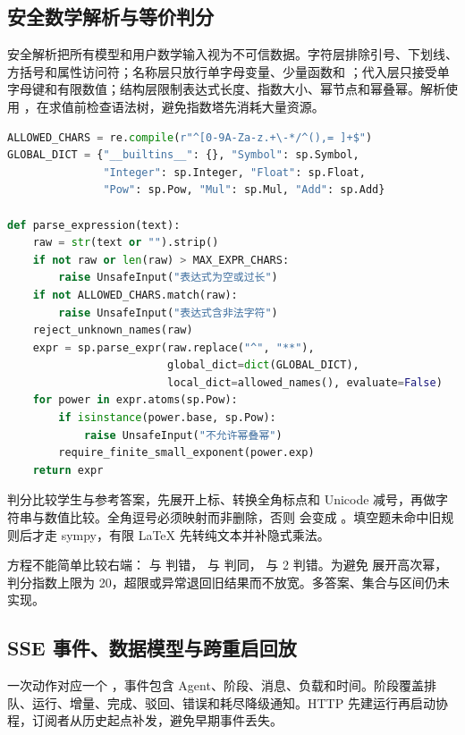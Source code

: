 \subsection{安全数学解析与等价判分}

安全解析把所有模型和用户数学输入视为不可信数据。字符层排除引号、下划线、方括号和属性访问符；名称层只放行单字母变量、少量函数和 ；代入层只接受单字母键和有限数值；结构层限制表达式长度、指数大小、幂节点和幂叠幂。解析使用 ，在求值前检查语法树，避免指数塔先消耗大量资源。

\begin{lstlisting}[language=python,caption={safe\_math 白名单与求值前幂结构检查节选},label={lst:safe-math}]
ALLOWED_CHARS = re.compile(r"^[0-9A-Za-z.+\-*/^(),= ]+$")
GLOBAL_DICT = {"__builtins__": {}, "Symbol": sp.Symbol,
               "Integer": sp.Integer, "Float": sp.Float,
               "Pow": sp.Pow, "Mul": sp.Mul, "Add": sp.Add}

def parse_expression(text):
    raw = str(text or "").strip()
    if not raw or len(raw) > MAX_EXPR_CHARS:
        raise UnsafeInput("表达式为空或过长")
    if not ALLOWED_CHARS.match(raw):
        raise UnsafeInput("表达式含非法字符")
    reject_unknown_names(raw)
    expr = sp.parse_expr(raw.replace("^", "**"),
                         global_dict=dict(GLOBAL_DICT),
                         local_dict=allowed_names(), evaluate=False)
    for power in expr.atoms(sp.Pow):
        if isinstance(power.base, sp.Pow):
            raise UnsafeInput("不允许幂叠幂")
        require_finite_small_exponent(power.exp)
    return expr
\end{lstlisting}

判分比较学生与参考答案，先展开上标、转换全角标点和 Unicode 减号，再做字符串与数值比较。全角逗号必须映射而非删除，否则  会变成 。填空题未命中旧规则后才走 sympy，有限 LaTeX 先转纯文本并补隐式乘法。

方程不能简单比较右端： 与  判错， 与  判同， 与 2 判错。为避免  展开高次幂，判分指数上限为 20，超限或异常退回旧结果而不放宽。多答案、集合与区间仍未实现。

\subsection{SSE 事件、数据模型与跨重启回放}

一次动作对应一个 ，事件包含 Agent、阶段、消息、负载和时间。阶段覆盖排队、运行、增量、完成、驳回、错误和耗尽降级通知。HTTP 先建运行再启动协程，订阅者从历史起点补发，避免早期事件丢失。


